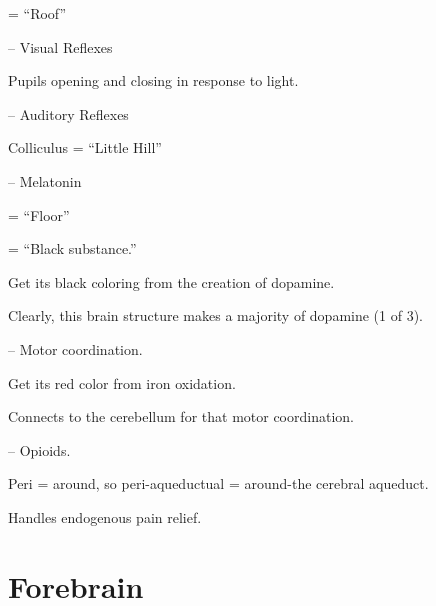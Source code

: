 \begin{coloredlist}
    \item {} = ``Roof''
    \begin{coloredlist}
        \item {} -- Visual Reflexes
        \begin{coloredlist}
            \item Pupils opening and closing in response to light.
        \end{coloredlist}
        \item {} -- Auditory Reflexes
        \item Colliculus = ``Little Hill''
        \item {} -- Melatonin
    \end{coloredlist}
    \item {} = ``Floor''
    \begin{coloredlist}
        \item {} = ``Black substance.''
        \begin{coloredlist}
            \item Get its black coloring from the creation of dopamine.
            \item Clearly, this brain structure makes a majority of dopamine (1 of 3).
        \end{coloredlist}
        \item {} -- Motor coordination.
        \begin{coloredlist}
            \item Get its red color from iron oxidation.
            \item Connects to the cerebellum for that motor coordination.
        \end{coloredlist}
        \item {} -- Opioids.
        \begin{coloredlist}
            \item Peri = around, so peri-aqueductual = around-the cerebral aqueduct.
            \item Handles endogenous pain relief.
        \end{coloredlist}
    \end{coloredlist}
\end{coloredlist}

\section{Forebrain}

